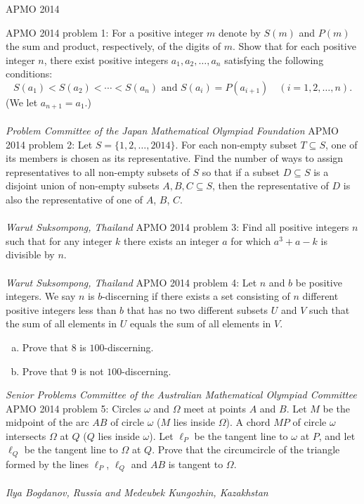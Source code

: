 APMO 2014 

APMO 2014 problem 1:  For a positive integer $m$ denote by $S(m)$ and $P(m)$ the sum and product, respectively, of the digits of $m$. Show that for each positive integer $n$, there exist positive integers $a_1, a_2, \ldots, a_n$ satisfying the following conditions:
\[ S(a_1) < S(a_2) < \cdots < S(a_n) \text{ and } S(a_i) = P(a_{i+1}) \quad (i=1,2,\ldots,n). \]
(We let $a_{n+1} = a_1$.) \\\\
\textit{Problem Committee of the Japan Mathematical Olympiad Foundation} 
APMO 2014 problem 2:  Let $S = \{1,2,\dots,2014\}$. For each non-empty subset $T \subseteq S$, one of its members is chosen as its representative. Find the number of ways to assign representatives to all non-empty subsets of $S$ so that if a subset $D \subseteq S$ is a disjoint union of non-empty subsets $A, B, C \subseteq S$, then the representative of $D$ is also the representative of one of $A$, $B$, $C$. \\\\
\textit{Warut Suksompong, Thailand} 
APMO 2014 problem 3:  Find all positive integers $n$ such that for any integer $k$ there exists an integer $a$ for which $a^3+a-k$ is divisible by $n$. \\\\
\textit{Warut Suksompong, Thailand} 
APMO 2014 problem 4:  Let $n$ and $b$ be positive integers. We say $n$ is $b$-discerning if there exists a set consisting of $n$ different positive integers less than $b$ that has no two different subsets $U$ and $V$ such that the sum of all elements in $U$ equals the sum of all elements in $V$.
\begin{enumerate}[(a)]
  \item Prove that $8$ is $100$-discerning.
  \item Prove that $9$ is not $100$-discerning.
\end{enumerate}
\textit{Senior Problems Committee of the Australian Mathematical Olympiad Committee} 
APMO 2014 problem 5:  Circles $\omega$ and $\Omega$ meet at points $A$ and $B$. Let $M$ be the midpoint of the arc $AB$ of circle $\omega$ ($M$ lies inside $\Omega$). A chord $MP$ of circle $\omega$ intersects $\Omega$ at $Q$ ($Q$ lies inside $\omega$). Let $\ell_P$ be the tangent line to $\omega$ at $P$, and let $\ell_Q$ be the tangent line to $\Omega$ at $Q$. Prove that the circumcircle of the triangle formed by the lines $\ell_P$, $\ell_Q$ and $AB$ is tangent to $\Omega$. \\\\
\textit{Ilya Bogdanov, Russia and Medeubek Kungozhin, Kazakhstan} 

